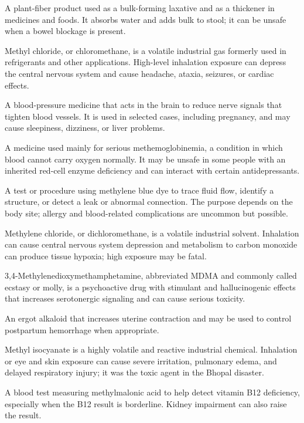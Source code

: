  A plant-fiber product used as a bulk-forming laxative and as a thickener in medicines and foods. It absorbs water and adds bulk to stool; it can be unsafe when a bowel blockage is present.

 Methyl chloride, or chloromethane, is a volatile industrial gas formerly used in refrigerants and other applications. High-level inhalation exposure can depress the central nervous system and cause headache, ataxia, seizures, or cardiac effects.

 A blood-pressure medicine that acts in the brain to reduce nerve signals that tighten blood vessels. It is used in selected cases, including pregnancy, and may cause sleepiness, dizziness, or liver problems.

 A medicine used mainly for serious methemoglobinemia, a condition in which blood cannot carry oxygen normally. It may be unsafe in some people with an inherited red-cell enzyme deficiency and can interact with certain antidepressants.

 A test or procedure using methylene blue dye to trace fluid flow, identify a structure, or detect a leak or abnormal connection. The purpose depends on the body site; allergy and blood-related complications are uncommon but possible.

 Methylene chloride, or dichloromethane, is a volatile industrial solvent. Inhalation can cause central nervous system depression and metabolism to carbon monoxide can produce tissue hypoxia; high exposure may be fatal.

 3,4-Methylenedioxymethamphetamine, abbreviated MDMA and commonly called ecstasy or molly, is a psychoactive drug with stimulant and hallucinogenic effects that increases serotonergic signaling and can cause serious toxicity.

 An ergot alkaloid that increases uterine contraction and may be used to control postpartum hemorrhage when appropriate.

 Methyl isocyanate is a highly volatile and reactive industrial chemical. Inhalation or eye and skin exposure can cause severe irritation, pulmonary edema, and delayed respiratory injury; it was the toxic agent in the Bhopal disaster.

 A blood test measuring methylmalonic acid to help detect vitamin B12 deficiency, especially when the B12 result is borderline. Kidney impairment can also raise the result.

